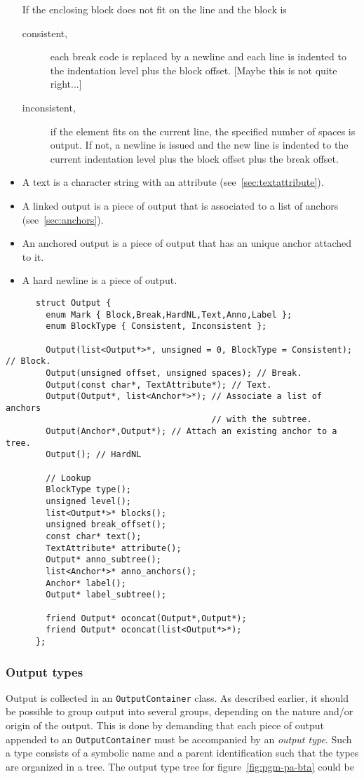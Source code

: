 \begin{docpart}
\begin{itemize}
  If the enclosing block does not fit on the line and the block is
  \begin{description}
  \item [consistent,] each break code is replaced by a newline and
    each line is indented to the indentation level plus the block
    offset. [Maybe this is not quite right...]
  \item [inconsistent,] if the element fits on the current line, the
    specified number of spaces is output. If not, a newline is issued
    and the new line is indented to the current indentation level plus
    the block offset plus the break offset.
  \end{description}
\item A text is a character string with an attribute
  (see~\ref{sec:textattribute}).
\item A linked output is a piece of output that is associated to
  a list of anchors (see~\ref{sec:anchors}).
\item An anchored output is a piece of output that has an unique
  anchor attached to it.
\item A hard newline is a piece of output.
\end{itemize}

  \begin{verbatim}
      struct Output {
        enum Mark { Block,Break,HardNL,Text,Anno,Label };
        enum BlockType { Consistent, Inconsistent };

        Output(list<Output*>*, unsigned = 0, BlockType = Consistent); // Block.
        Output(unsigned offset, unsigned spaces); // Break.
        Output(const char*, TextAttribute*); // Text.
        Output(Output*, list<Anchor*>*); // Associate a list of anchors
                                         // with the subtree.
        Output(Anchor*,Output*); // Attach an existing anchor to a tree.
        Output(); // HardNL

        // Lookup
        BlockType type();
        unsigned level();
        list<Output*>* blocks();
        unsigned break_offset();
        const char* text();
        TextAttribute* attribute();
        Output* anno_subtree();
        list<Anchor*>* anno_anchors();
        Anchor* label();
        Output* label_subtree();

        friend Output* oconcat(Output*,Output*);
        friend Output* oconcat(list<Output*>*);
      };
      \end{verbatim}

\subsubsection{Output types}
\label{sec:outputtypes}
Output is collected in an \texttt{OutputContainer} class.  As
described earlier, it should be possible to group output into several
groups, depending on the nature and/or origin of the output. This is
done by demanding that each piece of output appended to an
\texttt{OutputContainer} must be accompanied by an \emph{output type}.
Such a type consists of a symbolic name and a parent identification
such that the types are organized in a tree. The output type tree for
figure~\ref{fig:pgm-pa-bta} could be


\end{docpart}
